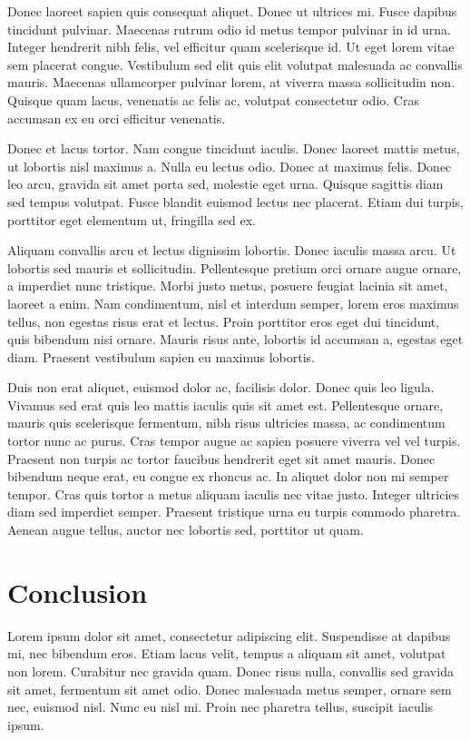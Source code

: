 Donec laoreet sapien quis consequat aliquet. Donec ut ultrices mi. Fusce dapibus tincidunt pulvinar. Maecenas rutrum odio id metus tempor pulvinar in id urna. Integer hendrerit nibh felis, vel efficitur quam scelerisque id. Ut eget lorem vitae sem placerat congue. Vestibulum sed elit quis elit volutpat malesuada ac convallis mauris. Maecenas ullamcorper pulvinar lorem, at viverra massa sollicitudin non. Quisque quam lacus, venenatis ac felis ac, volutpat consectetur odio. Cras accumsan ex eu orci efficitur venenatis.

Donec et lacus tortor. Nam congue tincidunt iaculis. Donec laoreet mattis metus, ut lobortis nisl maximus a. Nulla eu lectus odio. Donec at maximus felis. Donec leo arcu, gravida sit amet porta sed, molestie eget urna. Quisque sagittis diam sed tempus volutpat. Fusce blandit euismod lectus nec placerat. Etiam dui turpis, porttitor eget elementum ut, fringilla sed ex.

Aliquam convallis arcu et lectus dignissim lobortis. Donec iaculis massa arcu. Ut lobortis sed mauris et sollicitudin. Pellentesque pretium orci ornare augue ornare, a imperdiet nunc tristique. Morbi justo metus, posuere feugiat lacinia sit amet, laoreet a enim. Nam condimentum, nisl et interdum semper, lorem eros maximus tellus, non egestas risus erat et lectus. Proin porttitor eros eget dui tincidunt, quis bibendum nisi ornare. Mauris risus ante, lobortis id accumsan a, egestas eget diam. Praesent vestibulum sapien eu maximus lobortis.

Duis non erat aliquet, euismod dolor ac, facilisis dolor. Donec quis leo ligula. Vivamus sed erat quis leo mattis iaculis quis sit amet est. Pellentesque ornare, mauris quis scelerisque fermentum, nibh risus ultricies massa, ac condimentum tortor nunc ac purus. Cras tempor augue ac sapien posuere viverra vel vel turpis. Praesent non turpis ac tortor faucibus hendrerit eget sit amet mauris. Donec bibendum neque erat, eu congue ex rhoncus ac. In aliquet dolor non mi semper tempor. Cras quis tortor a metus aliquam iaculis nec vitae justo. Integer ultricies diam sed imperdiet semper. Praesent tristique urna eu turpis commodo pharetra. Aenean augue tellus, auctor nec lobortis sed, porttitor ut quam.

\section{Conclusion}
Lorem ipsum dolor sit amet, consectetur adipiscing elit. Suspendisse at dapibus mi, nec bibendum eros. Etiam lacus velit, tempus a aliquam sit amet, volutpat non lorem. Curabitur nec gravida quam. Donec risus nulla, convallis sed gravida sit amet, fermentum sit amet odio. Donec malesuada metus semper, ornare sem nec, euismod nisl. Nunc eu nisl mi. Proin nec pharetra tellus, suscipit iaculis ipsum.

